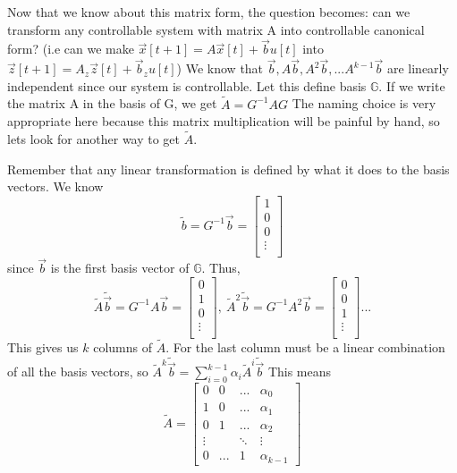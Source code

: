 \documentclass{article}
\begin{document}
Now that we know about this matrix form, the question becomes: can we transform any controllable system with matrix A into controllable canonical form?
(i.e can we make $\vec{x}[t+1]=A\vec{x}[t]+\vec{b}u[t]$ into $\vec{z}[t+1]=A_z\vec{z}[t]+\vec{b}_zu[t]$)
We know that $\vec{b}, A\vec{b}, A^2\vec{b}, ... A^{k-1}\vec{b}$ are linearly independent since our system is controllable. Let this define basis $\mathbb{G}$. If we write the matrix A in the basis of G, we get $\tilde{A}=G^{-1}AG$
The naming choice is very appropriate here because this matrix multiplication will be painful by hand, so lets look for another way to get $\tilde{A}$.

Remember that any linear transformation is defined by what it does to the basis vectors. We know
\[
    \tilde{b} = G^{-1}\vec{b} = \left[
        \begin{array}{c}
            1\\
            0\\
            0\\
            \vdots\\
        \end{array}
    \right]
\]
since $\vec{b}$ is the first basis vector of $\mathbb{G}$. Thus,
\[
    \tilde{A}\tilde{\vec{b}}=G^{-1}A\vec{b} = \left[
        \begin{array}{c}
            0\\
            1\\
            0\\
            \vdots\\
        \end{array}
    \right],\>
    \tilde{A}^2\tilde{\vec{b}} = G^{-1}A^2\vec{b} = \left[
        \begin{array}{c}
            0\\
            0\\
            1\\
            \vdots\\
        \end{array}
    \right] ...
\]
This gives us $k$ columns of $\tilde{A}$. For the last column must be a linear combination of all the basis vectors, so $\tilde{A}^k\tilde{\vec{b}}=\sum_{i=0}^{k-1}{\alpha_i\tilde{A}^i\tilde{\vec{b}}}$
This means
\[
    \tilde{A} = \left[
        \begin{array}{cccc}
            0 & 0 & ... & \alpha_0\\
            1 & 0 & ... & \alpha_1\\
            0 & 1 & ... & \alpha_2\\
            \vdots & & \ddots & \vdots\\
            0 & ... & 1 & \alpha_{k-1}
        \end{array}
    \right]
    \]
\end{document}
